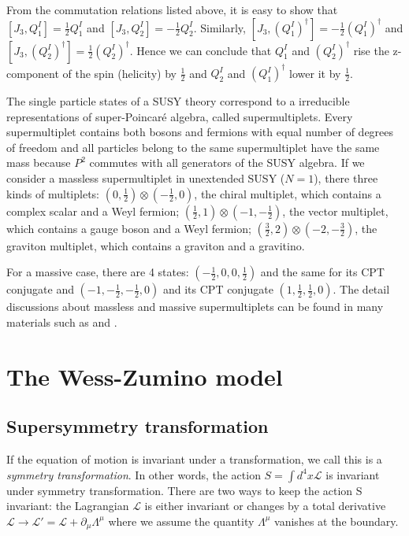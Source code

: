 \documentclass[12pt]{report}
\begin{document}
From the commutation relations listed above, it is easy to show that $[J_{3}, Q^{I}_{1}] = \frac{1}{2} Q^{I}_{1}$ and $[J_{3}, Q^{I}_{2}] = - \frac{1}{2} Q^{I}_{2}$.
Similarly, $[J_{3}, (Q^{I}_{1})^{\dag}] = -\frac{1}{2} (Q^{I}_{1})^{\dag}$ and $[J_{3}, (Q^{I}_{2})^{\dag}] = \frac{1}{2} (Q^{I}_{2})^{\dag}$.
Hence we can conclude that $Q^{I}_{1}$ and $(Q^{I}_{2})^{\dag}$ rise the z-component of the spin (helicity) by $\frac{1}{2}$ and $Q^{I}_{2}$ and $(Q^{I}_{1})^{\dag}$ lower it by $\frac{1}{2}$.

The single particle states of a SUSY theory correspond to a irreducible representations of super-Poincar\'{e} algebra, called supermultiplets.
Every supermultiplet contains both bosons and fermions with equal number of degrees of freedom and all particles belong to the same supermultiplet have the same mass because $P^{2}$ commutes with all generators of the SUSY algebra.
If we consider a massless supermultiplet in unextended SUSY ($N = 1$), there three kinds of multiplets:
$(0, \frac{1}{2}) \otimes (-\frac{1}{2}, 0)$, the chiral multiplet, which contains a complex scalar and a Weyl fermion;
$(\frac{1}{2}, 1) \otimes (-1, -\frac{1}{2})$, the vector multiplet, which contains a gauge boson and a Weyl fermion;
$(\frac{3}{2}, 2) \otimes (-2, -\frac{3}{2})$, the graviton multiplet, which contains a graviton and a gravitino.

For a massive case, there are 4 states: $(-\frac{1}{2}, 0, 0, \frac{1}{2})$ and the same for its CPT conjugate and $(-1, -\frac{1}{2}, -\frac{1}{2}, 0)$ and its CPT conjugate $(1, \frac{1}{2}, \frac{1}{2}, 0)$.
The detail discussions about massless and massive supermultiplets can be found in many materials such as \cite{Bilal} and \cite{larsenf}.





\chapter{The Wess-Zumino model}



\section{Supersymmetry transformation}
If the equation of motion is invariant under a transformation, we call this is a \textit{symmetry transformation}.
In other words, the action $S = \int d^{4}x \mathcal{L}$ is invariant under symmetry transformation.
There are two ways to keep the action S invariant: the Lagrangian $\mathcal{L}$ is either invariant or changes by a total derivative $\mathcal{L} \to \mathcal{L}' = \mathcal{L} + \partial_{\mu} \Lambda^{\mu}$ where we assume the quantity $\Lambda^{\mu}$ vanishes at the boundary.
\end{document}
